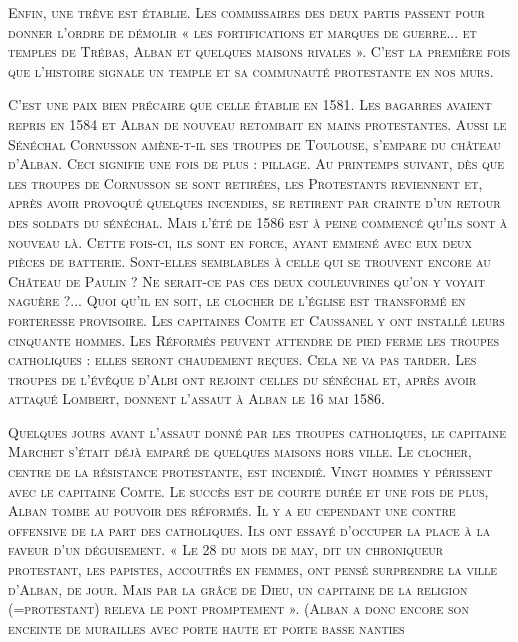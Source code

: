 
\lettrine{E}{nfin, une trêve est établie. Les commissaires des deux partis passent pour donner l'ordre de démolir « les fortifications et marques de guerre... et temples de Trébas, Alban et quelques maisons rivales ». C'est la première fois que l'histoire signale un temple et sa communauté protestante en nos murs.}

\lettrine{C}{'est une paix bien précaire que celle établie en 1581. Les bagarres avaient repris en 1584 et Alban de nouveau retombait en mains protestantes. Aussi le Sénéchal Cornusson amène-t-il ses troupes de Toulouse, s'empare du château d'Alban. Ceci signifie une fois de plus : pillage. Au printemps suivant, dès que les troupes de Cornusson se sont retirées, les Protestants reviennent et, après avoir provoqué quelques incendies, se retirent par crainte d'un retour des soldats du sénéchal. Mais l'été de 1586 est à peine commencé qu'ils sont à nouveau là. Cette fois-ci, ils sont en force, ayant emmené avec eux deux pièces de batterie. Sont-elles semblables à celle qui se trouvent encore au Château de Paulin ? Ne serait-ce pas ces deux couleuvrines qu'on y voyait naguère ?... Quoi qu'il en soit, le clocher de l'église est transformé en forteresse provisoire. Les capitaines Comte et Caussanel y ont installé leurs cinquante hommes. Les Réformés peuvent attendre de pied ferme les troupes catholiques : elles seront chaudement reçues. Cela ne va pas tarder. Les troupes de l'évêque d'Albi ont rejoint celles du sénéchal et, après avoir attaqué Lombert, donnent l'assaut à Alban le 16 mai 1586.}

\lettrine{Q}{uelques jours avant l'assaut donné par les troupes catholiques, le capitaine Marchet s'était déjà emparé de quelques maisons hors ville. Le clocher, centre de la résistance protestante, est incendié. Vingt hommes y périssent avec le capitaine Comte. Le succès est de courte durée et une fois de plus, Alban tombe au pouvoir des réformés. Il y a eu cependant une contre offensive de la part des catholiques. Ils ont essayé d'occuper la place à la faveur d'un déguisement. « Le 28 du mois de may, dit un chroniqueur protestant, les papistes, accoutrés en femmes, ont pensé surprendre la ville d'Alban, de jour. Mais par la grâce de Dieu, un capitaine de la religion (=protestant) releva le pont promptement ». (Alban a donc encore son enceinte de murailles avec porte haute et porte basse nanties}
